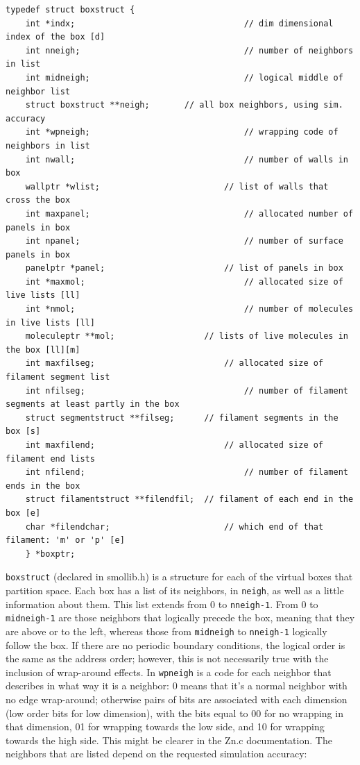 \documentclass {scrbook}
\newcommand {\ttt} {\texttt}
\begin{document}
\begin{lstlisting}
typedef struct boxstruct {
	int *indx;									// dim dimensional index of the box [d]
	int nneigh;									// number of neighbors in list
	int midneigh;								// logical middle of neighbor list
	struct boxstruct **neigh;		// all box neighbors, using sim. accuracy
	int *wpneigh;								// wrapping code of neighbors in list
	int nwall;									// number of walls in box
	wallptr *wlist;							// list of walls that cross the box
	int maxpanel;								// allocated number of panels in box
	int npanel;									// number of surface panels in box
	panelptr *panel;						// list of panels in box
	int *maxmol;								// allocated size of live lists [ll]
	int *nmol;									// number of molecules in live lists [ll]
	moleculeptr **mol;					// lists of live molecules in the box [ll][m]
	int maxfilseg;							// allocated size of filament segment list
	int nfilseg;								// number of filament segments at least partly in the box
	struct segmentstruct **filseg;		// filament segments in the box [s]
	int maxfilend;							// allocated size of filament end lists
	int nfilend;								// number of filament ends in the box
	struct filamentstruct **filendfil;	// filament of each end in the box [e]
	char *filendchar;						// which end of that filament: 'm' or 'p' [e]
	} *boxptr;
\end{lstlisting}

\ttt{boxstruct} (declared in smollib.h) is a structure for each of the virtual boxes that partition space. Each box has a list of its neighbors, in \ttt{neigh}, as well as a little information about them. This list extends from 0 to \ttt{nneigh-1}. From 0 to \ttt{midneigh-1} are those neighbors that logically precede the box, meaning that they are above or to the left, whereas those from \ttt{midneigh} to \ttt{nneigh-1} logically follow the box. If there are no periodic boundary conditions, the logical order is the same as the address order; however, this is not necessarily true with the inclusion of wrap-around effects. In \ttt{wpneigh} is a code for each neighbor that describes in what way it is a neighbor: 0 means that it's a normal neighbor with no edge wrap-around; otherwise pairs of bits are associated with each dimension (low order bits for low dimension), with the bits equal to 00 for no wrapping in that dimension, 01 for wrapping towards the low side, and 10 for wrapping towards the high side. This might be clearer in the Zn.c documentation. The neighbors that are listed depend on the requested simulation accuracy:
\end{document}
